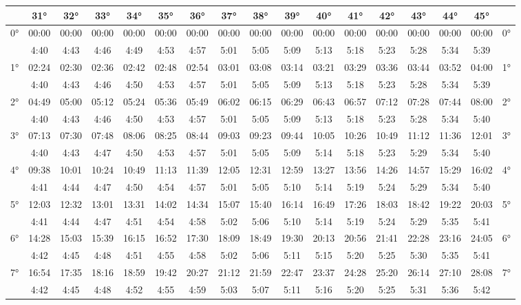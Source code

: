 \begin{scriptsize}\begin{tabular}{c || c | c | c | c | c | c | c | c | c | c | c | c | c | c | c || c}
		\space &31°&32°&33°&34°&35°&36°&37°&38°&39°&40°&41°&42°&43°&44°&45°\\\hline\hline
		\multirow{2}{*}{0°}&00:00&00:00&00:00&00:00&00:00&00:00&00:00&00:00&00:00&00:00&00:00&00:00&00:00&00:00&00:00&\multirow{2}{*}{0°}\\ \space&4:40&4:43&4:46&4:49&4:53&4:57&5:01&5:05&5:09&5:13&5:18&5:23&5:28&5:34&5:39&\space\\\hline
		\multirow{2}{*}{1°}&02:24&02:30&02:36&02:42&02:48&02:54&03:01&03:08&03:14&03:21&03:29&03:36&03:44&03:52&04:00&\multirow{2}{*}{1°}\\ \space&4:40&4:43&4:46&4:50&4:53&4:57&5:01&5:05&5:09&5:13&5:18&5:23&5:28&5:34&5:39&\space\\\hline
		\multirow{2}{*}{2°}&04:49&05:00&05:12&05:24&05:36&05:49&06:02&06:15&06:29&06:43&06:57&07:12&07:28&07:44&08:00&\multirow{2}{*}{2°}\\ \space&4:40&4:43&4:46&4:50&4:53&4:57&5:01&5:05&5:09&5:13&5:18&5:23&5:28&5:34&5:40&\space\\\hline
		\multirow{2}{*}{3°}&07:13&07:30&07:48&08:06&08:25&08:44&09:03&09:23&09:44&10:05&10:26&10:49&11:12&11:36&12:01&\multirow{2}{*}{3°}\\ \space&4:40&4:43&4:47&4:50&4:53&4:57&5:01&5:05&5:09&5:14&5:18&5:23&5:29&5:34&5:40&\space\\\hline
		\multirow{2}{*}{4°}&09:38&10:01&10:24&10:49&11:13&11:39&12:05&12:31&12:59&13:27&13:56&14:26&14:57&15:29&16:02&\multirow{2}{*}{4°}\\ \space&4:41&4:44&4:47&4:50&4:54&4:57&5:01&5:05&5:10&5:14&5:19&5:24&5:29&5:34&5:40&\space\\\hline
		\multirow{2}{*}{5°}&12:03&12:32&13:01&13:31&14:02&14:34&15:07&15:40&16:14&16:49&17:26&18:03&18:42&19:22&20:03&\multirow{2}{*}{5°}\\ \space&4:41&4:44&4:47&4:51&4:54&4:58&5:02&5:06&5:10&5:14&5:19&5:24&5:29&5:35&5:41&\space\\\hline
		\multirow{2}{*}{6°}&14:28&15:03&15:39&16:15&16:52&17:30&18:09&18:49&19:30&20:13&20:56&21:41&22:28&23:16&24:05&\multirow{2}{*}{6°}\\ \space&4:42&4:45&4:48&4:51&4:55&4:58&5:02&5:06&5:11&5:15&5:20&5:25&5:30&5:35&5:41&\space\\\hline
		\multirow{2}{*}{7°}&16:54&17:35&18:16&18:59&19:42&20:27&21:12&21:59&22:47&23:37&24:28&25:20&26:14&27:10&28:08&\multirow{2}{*}{7°}\\ \space&4:42&4:45&4:48&4:52&4:55&4:59&5:03&5:07&5:11&5:16&5:20&5:25&5:31&5:36&5:42&\space\\\hline

\end{tabular}
\end{scriptsize}
